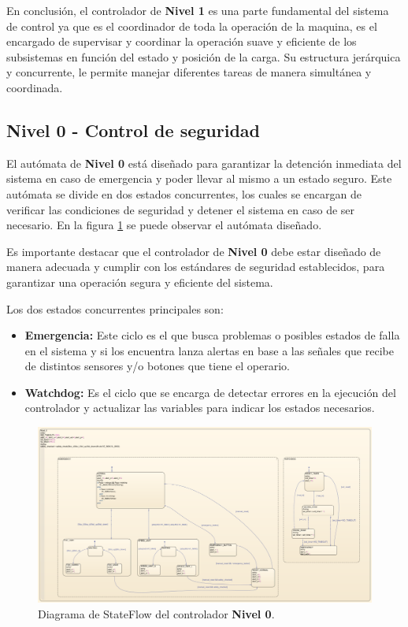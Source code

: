 \documentclass[11pt]{article}
\begin{document}
\newpage

En conclusión, el controlador de \textbf{Nivel 1} es una parte fundamental del sistema de control ya que es el coordinador de toda la operación de la maquina, es el encargado de supervisar y coordinar la operación suave y eficiente de los subsistemas en función del estado y posición de la carga. Su estructura jerárquica y concurrente, le permite manejar diferentes tareas de manera simultánea y coordinada.

\subsection{Nivel 0 - Control de seguridad}

El autómata de \textbf{Nivel 0} está diseñado para garantizar la detención inmediata del sistema en caso de emergencia y poder llevar al mismo a un estado seguro. Este autómata se divide en dos estados concurrentes, los cuales se encargan de verificar las condiciones de seguridad y detener el sistema en caso de ser necesario. En la figura \ref{fig:nivel_0} se puede observar el autómata diseñado.

Es importante destacar que el controlador de \textbf{Nivel 0} debe estar diseñado de manera adecuada y cumplir con los estándares de seguridad establecidos, para garantizar una operación segura y eficiente del sistema.

Los dos estados concurrentes principales son:
\begin{itemize}
	\item \textbf{Emergencia:} Este ciclo es el que busca problemas o posibles estados de falla en el sistema y si los encuentra lanza alertas en base a las señales que recibe de distintos sensores y/o botones que tiene el operario.
	\item \textbf{Watchdog:} Es el ciclo que se encarga de detectar errores en la ejecución del controlador y actualizar las variables para indicar los estados necesarios.
\end{itemize}

\begin{figure}[!h]
	\centering
	\includegraphics[width=1\textwidth]{images/imagen_26_nivel_0.png}
	\caption{Diagrama de StateFlow del controlador \textbf{Nivel 0}.}
	\label{fig:nivel_0}
\end{figure}
\end{document}
